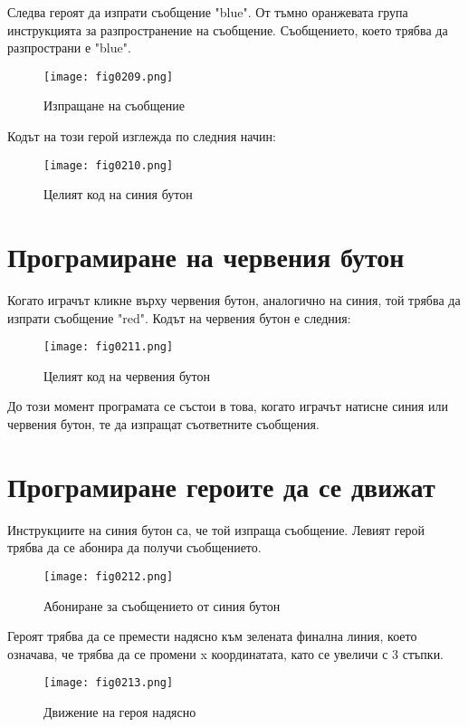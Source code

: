 Следва героят да изпрати съобщение "blue". От тъмно оранжевата група инструкцията за разпространение на съобщение. Съобщението, което трябва да разпространи е "blue".

\begin{figure}[H]
  \centering
  \texttt{[image: fig0209.png]}
  \caption{Изпращане на съобщение}
\label{fig0209}
\end{figure}

Кодът на този герой изглежда по следния начин:

\begin{figure}[H]
  \centering
  \texttt{[image: fig0210.png]}
  \caption{Целият код на синия бутон}
\label{fig0210}
\end{figure}

\section{Програмиране на червения бутон}
Когато играчът кликне върху червения бутон, аналогично на синия, той трябва да изпрати съобщение "red". Кодът на червения бутон е следния:

\begin{figure}[H]
  \centering
  \texttt{[image: fig0211.png]}
  \caption{Целият код на червения бутон}
\label{fig0211}
\end{figure}

До този момент програмата се състои в това, когато играчът натисне синия или червения бутон, те да изпращат съответните съобщения.

\section{Програмиране героите да се движат}
Инструкциите на синия бутон са, че той изпраща съобщение. Левият герой трябва да се абонира да получи съобщението.

\begin{figure}[H]
  \centering
  \texttt{[image: fig0212.png]}
  \caption{Абониране за съобщението от синия бутон}
\label{fig0212}
\end{figure}

Героят трябва да се премести надясно към зелената финална линия, което означава, че трябва да се промени x координатата, като се увеличи с 3 стъпки.

\begin{figure}[H]
  \centering
  \texttt{[image: fig0213.png]}
  \caption{Движение на героя надясно}
\label{fig0213}
\end{figure}

